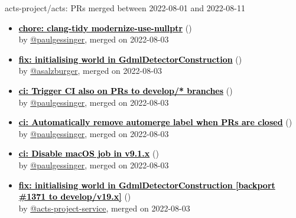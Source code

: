\begin{frame}[allowframebreaks]{ acts-project/acts: PRs merged 
between 2022-08-01 and 2022-08-11
}
\begin{itemize}
    \item\prmerged\textbf{\href{https://github.com/acts-project/acts/pull/1358}{\textcolor{black}{chore: clang-tidy modernize-use-nullptr}}}
    (\href{https://github.com/acts-project/acts/pull/1358}{}) \\
    by \href{https://github.com/paulgessinger}{@paulgessinger}, merged on 2022-08-03

    \item\prmerged\textbf{\href{https://github.com/acts-project/acts/pull/1371}{\textcolor{black}{fix: initialising world in GdmlDetectorConstruction}}}
    (\href{https://github.com/acts-project/acts/pull/1371}{}) \\
    by \href{https://github.com/asalzburger}{@asalzburger}, merged on 2022-08-03

    \item\prmerged\textbf{\href{https://github.com/acts-project/acts/pull/1367}{\textcolor{black}{ci: Trigger CI also on PRs to develop/* branches}}}
    (\href{https://github.com/acts-project/acts/pull/1367}{}) \\
    by \href{https://github.com/paulgessinger}{@paulgessinger}, merged on 2022-08-03

    \item\prmerged\textbf{\href{https://github.com/acts-project/acts/pull/1372}{\textcolor{black}{ci: Automatically remove automerge label when PRs are closed}}}
    (\href{https://github.com/acts-project/acts/pull/1372}{}) \\
    by \href{https://github.com/paulgessinger}{@paulgessinger}, merged on 2022-08-03

    \item\prmerged\textbf{\href{https://github.com/acts-project/acts/pull/1374}{\textcolor{black}{ci: Disable macOS job in v9.1.x}}}
    (\href{https://github.com/acts-project/acts/pull/1374}{}) \\
    by \href{https://github.com/paulgessinger}{@paulgessinger}, merged on 2022-08-03

    \item\prmerged\textbf{\href{https://github.com/acts-project/acts/pull/1375}{\textcolor{black}{fix: initialising world in GdmlDetectorConstruction [backport \#1371 to develop/v19.x]}}}
    (\href{https://github.com/acts-project/acts/pull/1375}{}) \\
    by \href{https://github.com/acts-project-service}{@acts-project-service}, merged on 2022-08-03


\end{itemize}
\end{frame}

